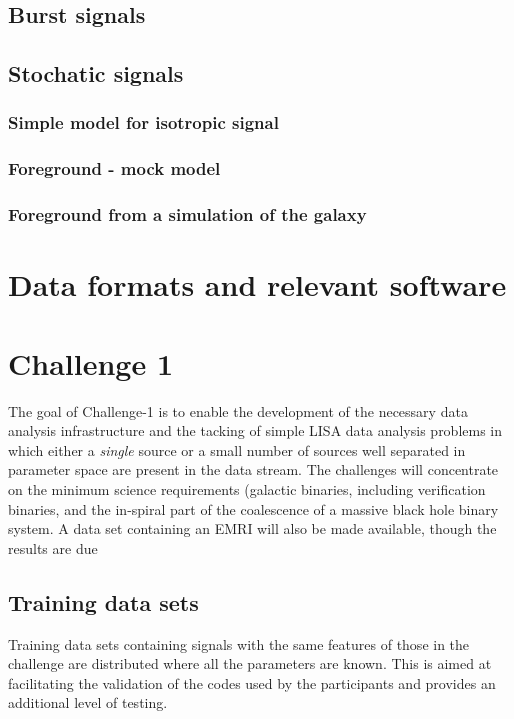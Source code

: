 \documentclass[11pt]{report}
\begin{document}
\section{Burst signals}

\section{Stochatic signals}

\subsection{Simple model for isotropic signal}

\subsection{Foreground - mock model}

\subsection{Foreground from a simulation of the galaxy}

\chapter{Data formats and relevant software}


\chapter{Challenge 1}

The goal of Challenge-1 is to enable the development of the necessary data analysis infrastructure and the tacking of simple LISA data analysis problems in which either a {\em single} source or a small number of sources well separated in parameter space are present in the data stream. The challenges will concentrate on the minimum science requirements (galactic binaries, including verification binaries, and the in-spiral part of the coalescence of a massive black hole binary system. A data set containing an EMRI will also be made available, though the results are due 

\section{Training data sets}

Training data sets containing signals with the same features of those in the challenge are distributed where all the parameters are known. This is aimed at facilitating the validation of the codes used by the participants and provides an additional level of testing.
\end{document}
